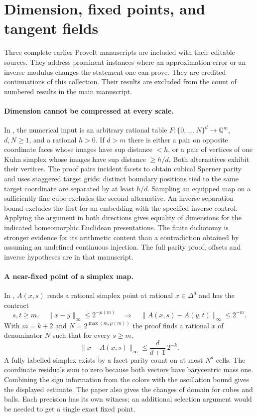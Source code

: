 \section{Dimension, fixed points, and tangent fields}\label{sec:companions}
Three complete earlier ProveIt manuscripts are included with their editable sources. They address prominent instances where an approximation error or an inverse modulus changes the statement one can prove. They are credited continuations of this collection. Their results are excluded from the count of numbered results in the main manuscript.

\paragraph{Dimension cannot be compressed at every scale.}
In , the numerical input is an arbitrary rational table $F:\{0,\ldots,N\}^d\to\mathbb Q^m$, $d,N\ge1$, and a rational $h>0$. If $d>m$ there is either a pair on opposite coordinate faces whose images have sup distance $<h$, or a pair of vertices of one Kuhn simplex whose images have sup distance $\ge h/d$. Both alternatives exhibit their vertices. The proof pairs incident facets to obtain cubical Sperner parity and uses staggered target grids: distinct boundary positions tied to the same target coordinate are separated by at least $h/d$. Sampling an equipped map on a sufficiently fine cube excludes the second alternative. An inverse separation bound excludes the first for an embedding with the specified inverse control. Applying the argument in both directions gives equality of dimensions for the indicated homeomorphic Euclidean presentations. The finite dichotomy is stronger evidence for its arithmetic content than a contradiction obtained by assuming an undefined continuous injection. The full parity proof, offsets and inverse hypotheses are in that manuscript.

\paragraph{A near-fixed point of a simplex map.}
In , $A(x,s)$ reads a rational simplex point at rational $x\in\Delta^d$ and has the contract
\[
 s,t\ge m,\quad \|x-y\|_\infty\le2^{-\mu(m)}
   \quad\Longrightarrow\quad\|A(x,s)-A(y,t)\|_\infty\le2^{-m}.
\]
With $m=k+2$ and $N=2^{\max(m,\mu(m))}$ the proof finds a rational $x$ of denominator $N$ such that for every $s\ge m$,
\[
             \|x-A(x,s)\|_\infty\le\frac{d}{d+1}\,2^{-k}.
\]
A fully labelled simplex exists by a facet parity count on at most $N^d$ cells. The coordinate residuals sum to zero because both vectors have barycentric mass one. Combining the sign information from the colors with the oscillation bound gives the displayed estimate. The paper also gives the changes of domain for cubes and balls. Each precision has its own witness; an additional selection argument would be needed to get a single exact fixed point.

